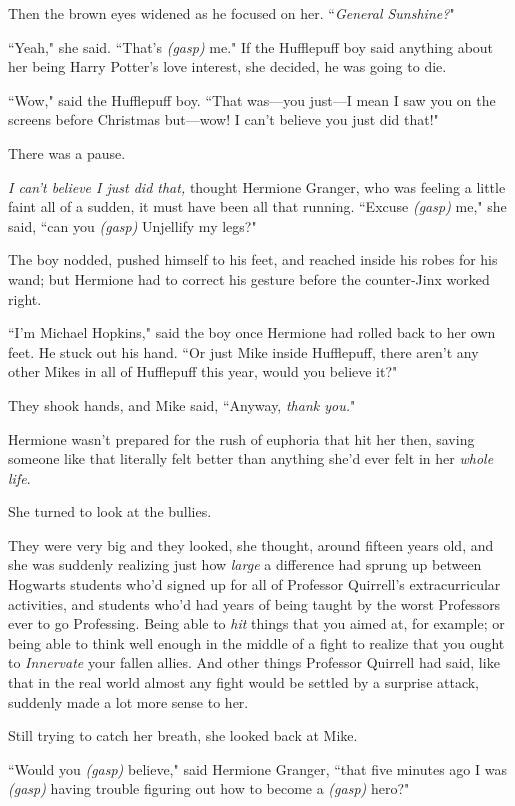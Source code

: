 Then the brown eyes widened as he focused on her. ``\emph{General Sunshine?}"

``Yeah," she said. ``That's \emph{(gasp)} me." If the Hufflepuff boy said anything about her being Harry Potter's love interest, she decided, he was going to die.

``Wow," said the Hufflepuff boy. ``That was---you just---I mean I saw you on the screens before Christmas but---wow! I can't believe you just did that!"

There was a pause.

\emph{I can't believe I just did that,} thought Hermione Granger, who was feeling a little faint all of a sudden, it must have been all that running. ``Excuse \emph{(gasp)} me," she said, ``can you \emph{(gasp)} Unjellify my legs?"

The boy nodded, pushed himself to his feet, and reached inside his robes for his wand; but Hermione had to correct his gesture before the counter-Jinx worked right.

``I'm Michael Hopkins," said the boy once Hermione had rolled back to her own feet. He stuck out his hand. ``Or just Mike inside Hufflepuff, there aren't any other Mikes in all of Hufflepuff this year, would you believe it?"

They shook hands, and Mike said, ``Anyway, \emph{thank you.}"

Hermione wasn't prepared for the rush of euphoria that hit her then, saving someone like that literally felt better than anything she'd ever felt in her \emph{whole life}.

She turned to look at the bullies.

They were very big and they looked, she thought, around fifteen years old, and she was suddenly realizing just how \emph{large} a difference had sprung up between Hogwarts students who'd signed up for all of Professor Quirrell's extracurricular activities, and students who'd had years of being taught by the worst Professors ever to go Professing. Being able to \emph{hit} things that you aimed at, for example; or being able to think well enough in the middle of a fight to realize that you ought to \emph{Innervate} your fallen allies. And other things Professor Quirrell had said, like that in the real world almost any fight would be settled by a surprise attack, suddenly made a lot more sense to her.

Still trying to catch her breath, she looked back at Mike.

``Would you \emph{(gasp)} believe," said Hermione Granger, ``that five minutes ago I was \emph{(gasp)} having trouble figuring out how to become a \emph{(gasp)} hero?"

